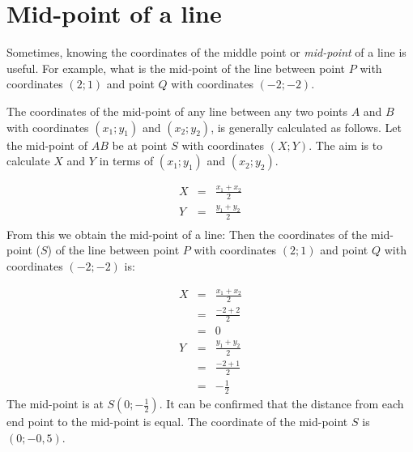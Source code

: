 \section{Mid-point of a line}
\nopagebreak
Sometimes, knowing the coordinates of the middle point or \textsl{mid-point} of a line is useful. For example, what is the mid-point of the line between point $P$ with coordinates $(2;1)$ and point $Q$ with coordinates $(-2;-2)$.\par 
The coordinates of the mid-point of any line between any two points $A$ and $B$ with coordinates $({x}_{1};{y}_{1})$ and $({x}_{2};{y}_{2})$, is generally calculated as follows. Let the mid-point of $AB$ be at point $S$ with coordinates $(X;Y)$. The aim is to calculate $X$ and $Y$ in terms of $({x}_{1};{y}_{1})$ and $({x}_{2};{y}_{2})$.\par 
\setcounter{subfigure}{0}
\begin{figure}[H] %
\begin{center}
\end{center}
\end{figure}      

\begin{eqnarray*}
X & = & \frac{{x}_{1} + {x}_{2}}{2} \\ 
Y & = & \frac{{y}_{1} + {y}_{2}}{2} \\  
\end{eqnarray*}
From this we obtain the mid-point of a line:
\label{m39119*id68788}Then the coordinates of the mid-point ($S$) of the line between point $P$ with coordinates $(2;1)$ and point $Q$ with coordinates $(-2;-2)$ is:


\begin{eqnarray*}
X & = & \frac{{x}_{1} + {x}_{2}}{2} \\ 
& = & \frac{-2 + 2}{2} \\ 
& = & 0 \\ 
Y & = & \frac{{y}_{1} + {y}_{2}}{2} \\ 
& = & \frac{-2 + 1}{2} \\ 
& = & -\frac{1}{2} 
\end{eqnarray*}
The mid-point is at $S(0;-\frac{1}{2})$. 
It can be confirmed that the distance from each end point to the mid-point is equal. The coordinate of the mid-point $S$ is $(0;-0,5)$.\par 

